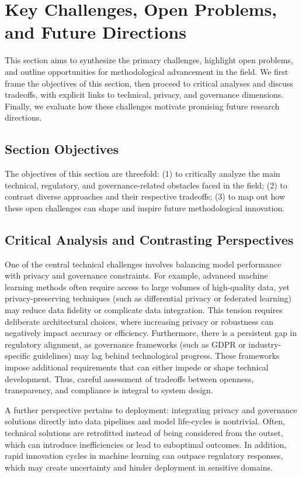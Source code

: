 \documentclass[sigconf]{acmart}
\begin{document}
\section{Key Challenges, Open Problems, and Future Directions}

This section aims to synthesize the primary challenges, highlight open problems, and outline opportunities for methodological advancement in the field. We first frame the objectives of this section, then proceed to critical analyses and discuss tradeoffs, with explicit links to technical, privacy, and governance dimensions. Finally, we evaluate how these challenges motivate promising future research directions.

\subsection{Section Objectives}

The objectives of this section are threefold: (1) to critically analyze the main technical, regulatory, and governance-related obstacles faced in the field; (2) to contrast diverse approaches and their respective tradeoffs; (3) to map out how these open challenges can shape and inspire future methodological innovation.

\subsection{Critical Analysis and Contrasting Perspectives}

One of the central technical challenges involves balancing model performance with privacy and governance constraints. For example, advanced machine learning methods often require access to large volumes of high-quality data, yet privacy-preserving techniques (such as differential privacy or federated learning) may reduce data fidelity or complicate data integration. This tension requires deliberate architectural choices, where increasing privacy or robustness can negatively impact accuracy or efficiency. Furthermore, there is a persistent gap in regulatory alignment, as governance frameworks (such as GDPR or industry-specific guidelines) may lag behind technological progress. These frameworks impose additional requirements that can either impede or shape technical development. Thus, careful assessment of tradeoffs between openness, transparency, and compliance is integral to system design.

A further perspective pertains to deployment: integrating privacy and governance solutions directly into data pipelines and model life-cycles is nontrivial. Often, technical solutions are retrofitted instead of being considered from the outset, which can introduce inefficiencies or lead to suboptimal outcomes. In addition, rapid innovation cycles in machine learning can outpace regulatory responses, which may create uncertainty and hinder deployment in sensitive domains.
\end{document}
